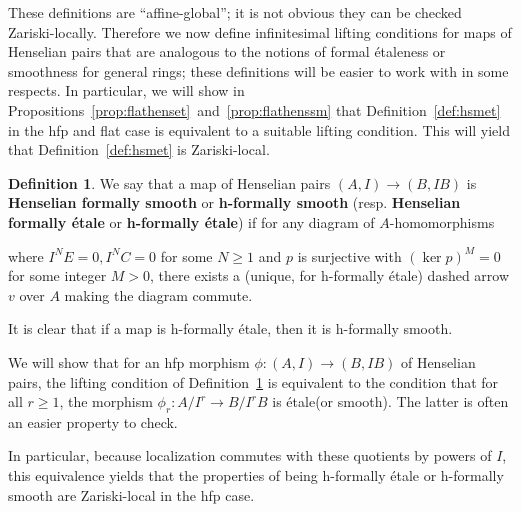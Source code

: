 \documentclass[12pt]{article}
\newcommand{\Et}{\'etale\xspace}
\newcommand{\hfp}{hfp\xspace}
\newcommand{\hfetale}{h-formally \'etale\xspace}
\newcommand{\hfsmooth}{h-formally smooth\xspace}
\theoremstyle{definition}
\newtheorem{definition}[theorem]{Definition}
\numberwithin{equation}{subsection}
\begin{document}
These definitions are ``affine-global''; it is not obvious they can be checked Zariski-locally. Therefore we now define infinitesimal lifting conditions for maps of Henselian pairs that are analogous to the notions of formal {\Et}ness or smoothness for general rings; these definitions will be easier to work with in some respects. In particular, we will show in Propositions~\ref{prop:flathenset}~and~\ref{prop:flathenssm} that Definition~\ref{def:hsmet} in the \hfp and flat case is equivalent to a suitable lifting condition. This will yield that Definition~\ref{def:hsmet} is Zariski-local.

\begin{definition}\label{def:hfsmet}
We say that a map of Henselian pairs $(A,I) \to (B,IB)$ is {\bf Henselian formally smooth} or {\bf \hfsmooth} (resp. {\bf Henselian formally \Et} or {\bf \hfetale}) if for any diagram of $A$-homomorphisms

\begin{center}
\end{center} \vspace{-.25in}


where $I^NE=0, I^NC=0$ for some $N \ge 1$ and $p$ is surjective with $(\ker p)^M=0$ for some integer $M > 0$, there exists a (unique, for \hfetale) dashed arrow $v$ over $A$ making the diagram commute. 
\end{definition}


It is clear that if a map is \hfetale, then it is \hfsmooth. 

We will show that for an \hfp morphism $\phi: (A,I) \to (B,IB)$ of Henselian pairs, the lifting condition of Definition~\ref{def:hfsmet} is equivalent to the condition that for all $r \ge 1$, the morphism $\phi_r: A/I^r \to B/I^rB$ is \Et (or smooth). The latter is often an easier property to check. 

In particular, because localization commutes with these quotients by powers of $I$, this equivalence yields that the properties of being \hfetale or \hfsmooth are Zariski-local in the \hfp case.
\end{document}
